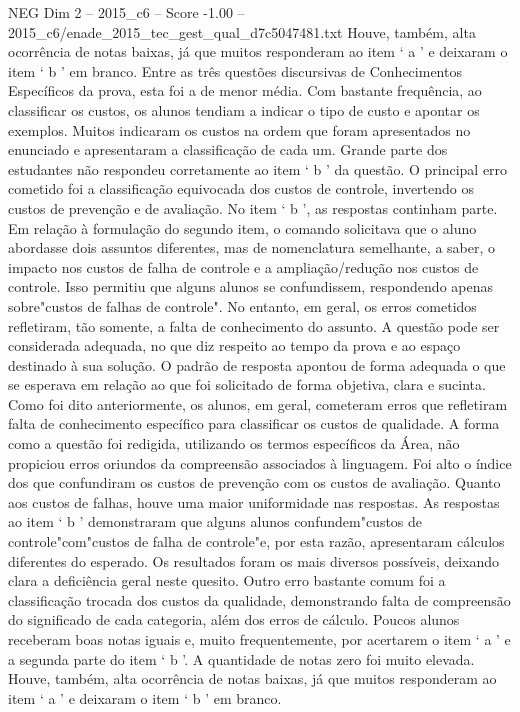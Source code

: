 \begin{textsample}{NEG Dim 2 – 2015\_c6 – Score -1.00 – 2015\_c6/enade\_2015\_tec\_gest\_qual\_d7c5047481.txt}
Houve, também, alta ocorrência de notas baixas, já que muitos responderam ao item ‘ a ’ e deixaram o item ‘ b ’ em branco.
Entre as três questões discursivas de Conhecimentos Específicos da prova, esta foi a de menor média.
Com bastante frequência, ao classificar os custos, os alunos tendiam a indicar o tipo de custo e apontar os exemplos.
Muitos indicaram os custos na ordem que foram apresentados no enunciado e apresentaram a classificação de cada um.
Grande parte dos estudantes não respondeu corretamente ao item ‘ b ’ da questão.
O principal erro cometido foi a classificação equivocada dos custos de controle, invertendo os custos de prevenção e de avaliação.
No item ‘ b ’, as respostas continham parte.
Em relação à formulação do segundo item, o comando solicitava que o aluno abordasse dois assuntos diferentes, mas de nomenclatura semelhante, a saber, o impacto nos custos de falha de controle e a ampliação/redução nos custos de controle.
Isso permitiu que alguns alunos se confundissem, respondendo apenas sobre"custos de falhas de controle".
No entanto, em geral, os erros cometidos refletiram, tão somente, a falta de conhecimento do assunto.
A questão pode ser considerada adequada, no que diz respeito ao tempo da prova e ao espaço destinado à sua solução.
O padrão de resposta apontou de forma adequada o que se esperava em relação ao que foi solicitado de forma objetiva, clara e sucinta.
Como foi dito anteriormente, os alunos, em geral, cometeram erros que refletiram falta de conhecimento específico para classificar os custos de qualidade.
A forma como a questão foi redigida, utilizando os termos específicos da Área, não propiciou erros oriundos da compreensão associados à linguagem.
Foi alto o índice dos que confundiram os custos de prevenção com os custos de avaliação.
Quanto aos custos de falhas, houve uma maior uniformidade nas respostas.
As respostas ao item ‘ b ’ demonstraram que alguns alunos confundem"custos de controle"com"custos de falha de controle"e, por esta razão, apresentaram cálculos diferentes do esperado.
Os resultados foram os mais diversos possíveis, deixando clara a deficiência geral neste quesito.
Outro erro bastante comum foi a classificação trocada dos custos da qualidade, demonstrando falta de compreensão do significado de cada categoria, além dos erros de cálculo.
Poucos alunos receberam boas notas iguais e, muito frequentemente, por acertarem o item ‘ a ’ e a segunda parte do item ‘ b ’.
A quantidade de notas zero foi muito elevada.
Houve, também, alta ocorrência de notas baixas, já que muitos responderam ao item ‘ a ’ e deixaram o item ‘ b ’ em branco.

\end{textsample}
